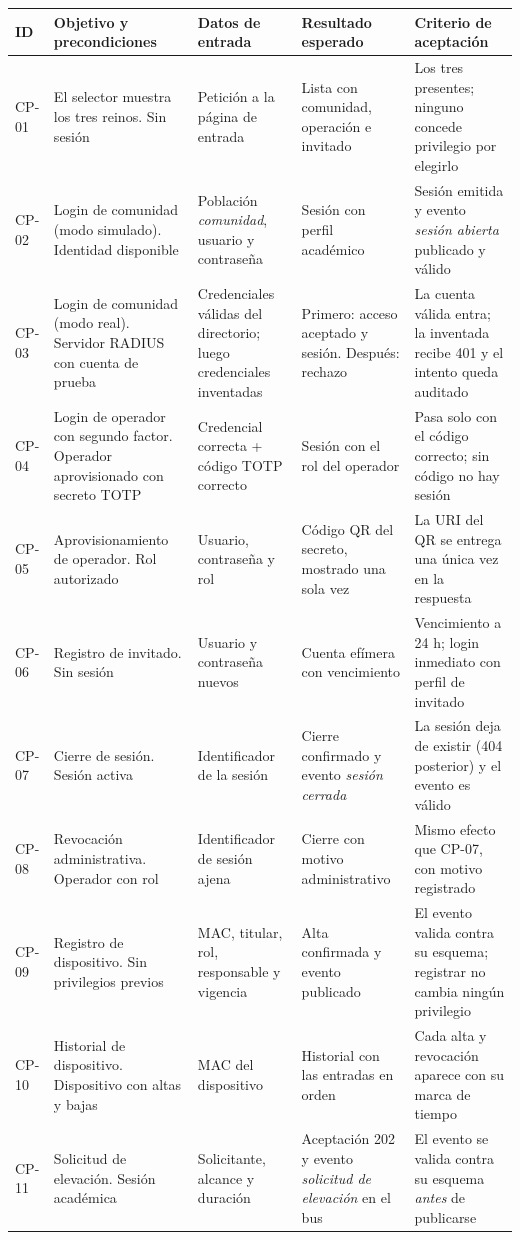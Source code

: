 \documentclass[11pt,a4paper]{article}
\begin{document}
\begin{longtable}{p{1.1cm}p{3.4cm}p{3.2cm}p{3.4cm}p{3.2cm}}
\toprule
\textbf{ID} & \textbf{Objetivo y precondiciones} & \textbf{Datos de entrada} & \textbf{Resultado esperado} & \textbf{Criterio de aceptación}\\
\midrule
CP-01 & El selector muestra los tres reinos. Sin sesión & Petición a la página de entrada & Lista con comunidad, operación e invitado & Los tres presentes; ninguno concede privilegio por elegirlo\\
CP-02 & Login de comunidad (modo simulado). Identidad disponible & Población \emph{comunidad}, usuario y contraseña & Sesión con perfil académico & Sesión emitida y evento \emph{sesión abierta} publicado y válido\\
CP-03 & Login de comunidad (modo real). Servidor RADIUS con cuenta de prueba & Credenciales válidas del directorio; luego credenciales inventadas & Primero: acceso aceptado y sesión. Después: rechazo & La cuenta válida entra; la inventada recibe 401 y el intento queda auditado\\
CP-04 & Login de operador con segundo factor. Operador aprovisionado con secreto TOTP & Credencial correcta + código TOTP correcto & Sesión con el rol del operador & Pasa solo con el código correcto; sin código no hay sesión\\
CP-05 & Aprovisionamiento de operador. Rol autorizado & Usuario, contraseña y rol & Código QR del secreto, mostrado una sola vez & La URI del QR se entrega una única vez en la respuesta\\
CP-06 & Registro de invitado. Sin sesión & Usuario y contraseña nuevos & Cuenta efímera con vencimiento & Vencimiento a 24 h; login inmediato con perfil de invitado\\
CP-07 & Cierre de sesión. Sesión activa & Identificador de la sesión & Cierre confirmado y evento \emph{sesión cerrada} & La sesión deja de existir (404 posterior) y el evento es válido\\
CP-08 & Revocación administrativa. Operador con rol & Identificador de sesión ajena & Cierre con motivo administrativo & Mismo efecto que CP-07, con motivo registrado\\
CP-09 & Registro de dispositivo. Sin privilegios previos & MAC, titular, rol, responsable y vigencia & Alta confirmada y evento publicado & El evento valida contra su esquema; registrar no cambia ningún privilegio\\
CP-10 & Historial de dispositivo. Dispositivo con altas y bajas & MAC del dispositivo & Historial con las entradas en orden & Cada alta y revocación aparece con su marca de tiempo\\
CP-11 & Solicitud de elevación. Sesión académica & Solicitante, alcance y duración & Aceptación 202 y evento \emph{solicitud de elevación} en el bus & El evento se valida contra su esquema \emph{antes} de publicarse\\
\bottomrule
\end{longtable}
\end{document}
